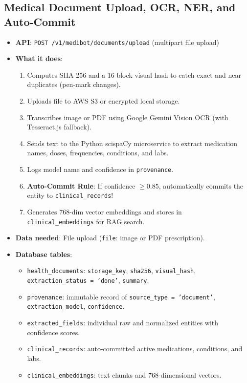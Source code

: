 \documentclass[11pt,a4paper]{article}
\begin{document}
\subsection{Medical Document Upload, OCR, NER, and Auto-Commit}
\begin{itemize}
    \item \textbf{API}: \texttt{POST /v1/medibot/documents/upload} (multipart file upload)
    \item \textbf{What it does}:
    \begin{enumerate}
        \item Computes SHA-256 and a 16-block visual hash to catch exact and near duplicates (pen-mark changes).
        \item Uploads file to AWS S3 or encrypted local storage.
        \item Transcribes image or PDF using Google Gemini Vision OCR (with Tesseract.js fallback).
        \item Sends text to the Python scispaCy microservice to extract medication names, doses, frequencies, conditions, and labs.
        \item Logs model name and confidence in \texttt{provenance}.
        \item \textbf{Auto-Commit Rule}: If confidence $\ge 0.85$, automatically commits the entity to \texttt{clinical\_records}!
        \item Generates 768-dim vector embeddings and stores in \texttt{clinical\_embeddings} for RAG search.
    \end{enumerate}
    \item \textbf{Data needed}: File upload (\texttt{file}: image or PDF prescription).
    \item \textbf{Database tables}:
    \begin{itemize}
        \item \texttt{health\_documents}: \texttt{storage\_key}, \texttt{sha256}, \texttt{visual\_hash}, \texttt{extraction\_status = 'done'}, \texttt{summary}.
        \item \texttt{provenance}: immutable record of \texttt{source\_type = 'document'}, \texttt{extraction\_model}, \texttt{confidence}.
        \item \texttt{extracted\_fields}: individual raw and normalized entities with confidence scores.
        \item \texttt{clinical\_records}: auto-committed active medications, conditions, and labs.
        \item \texttt{clinical\_embeddings}: text chunks and 768-dimensional vectors.

\end{itemize}
\end{itemize}
\end{document}
